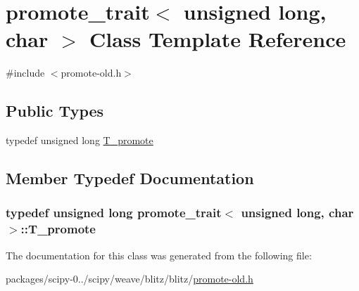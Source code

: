 \hypertarget{classpromote__trait_3_01unsigned_01long_00_01char_01_4}{}\section{promote\+\_\+trait$<$ unsigned long, char $>$ Class Template Reference}
\label{classpromote__trait_3_01unsigned_01long_00_01char_01_4}


{\ttfamily \#include $<$promote-\/old.\+h$>$}

\subsection*{Public Types}
\begin{DoxyCompactItemize}
\item 
typedef unsigned long \hyperlink{classpromote__trait_3_01unsigned_01long_00_01char_01_4_a767fefb1dc28d5138b47b7e7f68b80df}{T\+\_\+promote}
\end{DoxyCompactItemize}


\subsection{Member Typedef Documentation}
\hypertarget{classpromote__trait_3_01unsigned_01long_00_01char_01_4_a767fefb1dc28d5138b47b7e7f68b80df}{}
\subsubsection[{T\+\_\+promote}]{\setlength{\rightskip}{0pt plus 5cm}typedef unsigned long {\bf promote\+\_\+trait}$<$ unsigned long, char $>$\+::{\bf T\+\_\+promote}}\label{classpromote__trait_3_01unsigned_01long_00_01char_01_4_a767fefb1dc28d5138b47b7e7f68b80df}


The documentation for this class was generated from the following file\+:\begin{DoxyCompactItemize}
\item 
packages/scipy-\/0../scipy/weave/blitz/blitz/\hyperlink{promote-old_8h}{promote-\/old.\+h}\end{DoxyCompactItemize}
